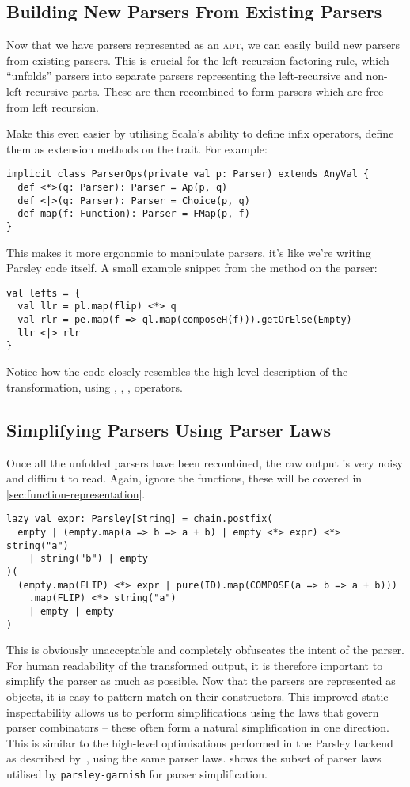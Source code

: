 \documentclass[../../main.tex]{subfiles}
\begin{document}
\subsection{Building New Parsers From Existing Parsers}
Now that we have parsers represented as an \textsc{adt}, we can easily build new parsers from existing parsers.
This is crucial for the left-recursion factoring rule, which ``unfolds'' parsers into separate parsers representing the left-recursive and non-left-recursive parts.
These are then recombined to form parsers which are free from left recursion.

Make this even easier by utilising Scala's ability to define infix operators, define them as extension methods on the  trait.
For example:
\begin{verbatim}
implicit class ParserOps(private val p: Parser) extends AnyVal {
  def <*>(q: Parser): Parser = Ap(p, q)
  def <|>(q: Parser): Parser = Choice(p, q)
  def map(f: Function): Parser = FMap(p, f)
}
\end{verbatim}
%
This makes it more ergonomic to manipulate parsers, it's like we're writing Parsley code itself.
A small example snippet from the  method on the  parser:
\begin{verbatim}
val lefts = {
  val llr = pl.map(flip) <*> q
  val rlr = pe.map(f => ql.map(composeH(f))).getOrElse(Empty)
  llr <|> rlr
}
\end{verbatim}
Notice how the code closely resembles the high-level description of the transformation, using \scala{<*>}, \scala{<|>}, , operators.

\subsection{Simplifying Parsers Using Parser Laws}\label{sec:simplify-parsers}
Once all the unfolded parsers have been recombined, the raw output is very noisy and difficult to read.
Again, ignore the functions, these will be covered in \cref{sec:function-representation}.
\begin{verbatim}
lazy val expr: Parsley[String] = chain.postfix(
  empty | (empty.map(a => b => a + b) | empty <*> expr) <*> string("a")
    | string("b") | empty
)(
  (empty.map(FLIP) <*> expr | pure(ID).map(COMPOSE(a => b => a + b)))
    .map(FLIP) <*> string("a")
    | empty | empty
)
\end{verbatim}
%
This is obviously unacceptable and completely obfuscates the intent of the parser.
For human readability of the transformed output, it is therefore important to simplify the parser as much as possible.
Now that the parsers are represented as objects, it is easy to pattern match on their constructors.
This improved static inspectability allows us to perform simplifications using the laws that govern parser combinators -- these often form a natural simplification in one direction.
This is similar to the high-level optimisations performed in the Parsley backend as described by~\textcite{willis_staged_2023}, using the same parser laws.
 shows the subset of parser laws utilised by \texttt{parsley-garnish} for parser simplification.
\end{document}

